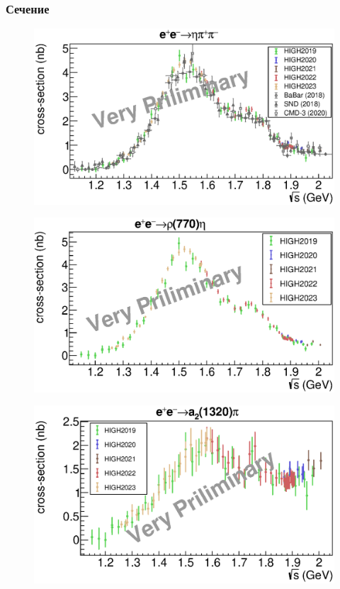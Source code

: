 \documentclass{beamer}
\begin{document}
\begin{frame}
  \frametitle{Сечение}
  \begin{minipage}[t]{0.45\linewidth}
    \begin{figure}
      \includegraphics[width=\linewidth]{figures/bcs_etapipi.eps}
    \end{figure}
  \end{minipage}
  \begin{minipage}[t]{0.45\linewidth}
    \begin{figure}
      \includegraphics[width=\linewidth]{figures/bcs_partial_rhoeta.eps}
    \end{figure}
  \end{minipage}
  \begin{minipage}[t]{0.45\linewidth}
    \begin{figure}
      \includegraphics[width=\linewidth]{figures/bcs_partial_a2pi.eps}

\end{figure}
\end{minipage}
\end{frame}
\end{document}
